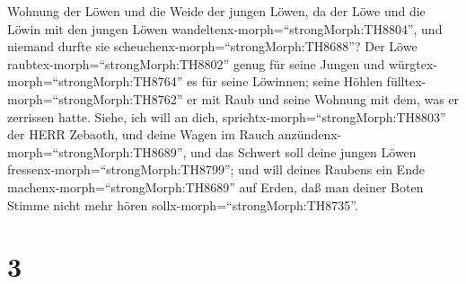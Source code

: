 Wohnung der Löwen und die Weide der jungen Löwen, da der Löwe und die
Löwin mit den jungen Löwen wandeltenx-morph=``strongMorph:TH8804'', und
niemand durfte sie scheuchenx-morph=``strongMorph:TH8688''?
 Der Löwe raubtex-morph=``strongMorph:TH8802'' genug für
seine Jungen und würgtex-morph=``strongMorph:TH8764'' es für seine
Löwinnen; seine Höhlen fülltex-morph=``strongMorph:TH8762'' er mit Raub
und seine Wohnung mit dem, was er zerrissen hatte.  Siehe,
ich will an dich, sprichtx-morph=``strongMorph:TH8803'' der HERR
Zebaoth, und deine Wagen im Rauch
anzündenx-morph=``strongMorph:TH8689'', und das Schwert soll deine
jungen Löwen fressenx-morph=``strongMorph:TH8799''; und will deines
Raubens ein Ende machenx-morph=``strongMorph:TH8689'' auf Erden, daß man
deiner Boten Stimme nicht mehr hören sollx-morph=``strongMorph:TH8735''.

\hypertarget{section-2}{%
\section{3}\label{section-2}}

